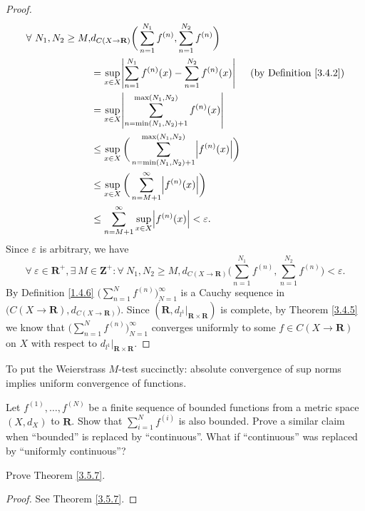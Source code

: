 \begin{proof}
\begin{align*}
        \forall\ N_1, N_2 \geq M, & d_{C(X \to \mathbf{R})}\bigg(\sum_{n = 1}^{N_1} f^{(n)}, \sum_{n = 1}^{N_2} f^{(n)}\bigg)                                             \\
                                  & = \sup_{x \in X} \abs*{\sum_{n = 1}^{N_1} f^{(n)}(x) - \sum_{n = 1}^{N_2} f^{(n)}(x)}            & \text{(by Definition \ref{3.4.2})} \\
                                  & = \sup_{x \in X} \abs*{\sum_{n = \min(N_1, N_2) + 1}^{\max(N_1, N_2)} f^{(n)}(x)}                                                     \\
                                  & \leq \sup_{x \in X} \bigg(\sum_{n = \min(N_1, N_2) + 1}^{\max(N_1, N_2)} \abs*{f^{(n)}(x)}\bigg)                                      \\
                                  & \leq \sup_{x \in X} \bigg(\sum_{n = M + 1}^\infty \abs*{f^{(n)}(x)}\bigg)                                                             \\
                                  & \leq \sum_{n = M + 1}^\infty \sup_{x \in X} \abs*{f^{(n)}(x)} < \varepsilon.
    \end{align*}
    Since \(\varepsilon\) is arbitrary, we have
    \[
        \forall\ \varepsilon \in \mathbf{R}^+, \exists\ M \in \mathbf{Z}^+ : \forall\ N_1, N_2 \geq M, d_{C(X \to \mathbf{R})}\bigg(\sum_{n = 1}^{N_1} f^{(n)}, \sum_{n = 1}^{N_2} f^{(n)}\bigg) < \varepsilon.
    \]
    By Definition \ref{1.4.6} \(\bigg(\sum_{n = 1}^N f^{(n)}\bigg)_{N = 1}^\infty\) is a Cauchy sequence in \(\big(C(X \to \mathbf{R}), d_{C(X \to \mathbf{R})}\big)\).
    Since \((\mathbf{R}, d_{l^1}|_{\mathbf{R} \times \mathbf{R}})\) is complete, by Theorem \ref{3.4.5} we know that \(\bigg(\sum_{n = 1}^N f^{(n)}\bigg)_{N = 1}^\infty\) converges uniformly to some \(f \in C(X \to \mathbf{R})\) on \(X\) with respect to \(d_{l^1}|_{\mathbf{R} \times \mathbf{R}}\).
\end{proof}

\begin{note}
    To put the Weierstrass \(M\)-test succinctly:
    absolute convergence of sup norms implies uniform convergence of functions.
\end{note}

\exercisesection

\begin{exercise}\label{ex 3.5.1}
    Let \(f^{(1)}, \dots, f^{(N)}\) be a finite sequence of bounded functions from a metric space \((X, d_X)\) to \(\mathbf{R}\).
    Show that \(\sum_{i = 1}^N f^{(i)}\) is also bounded.
    Prove a similar claim when ``bounded'' is replaced by ``continuous''.
    What if ``continuous'' was replaced by ``uniformly continuous''?
\end{exercise}

\begin{exercise}\label{ex 3.5.2}
    Prove Theorem \ref{3.5.7}.
\end{exercise}

\begin{proof}
    See Theorem \ref{3.5.7}.
\end{proof}